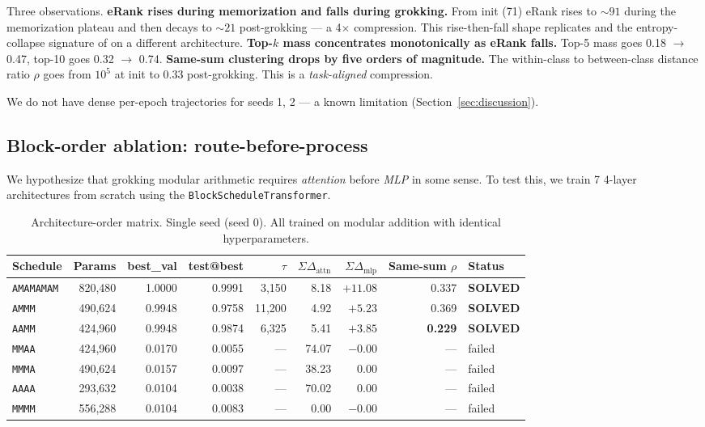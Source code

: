 \documentclass{article}
\begin{document}
Three observations. \textbf{eRank rises during memorization and falls during grokking.} From init (71) eRank rises to $\sim 91$ during the memorization plateau and then decays to $\sim 21$ post-grokking --- a 4$\times$ compression. This rise-then-fall shape replicates \citet{chen2025complexity} and the entropy-collapse signature of \citet{anonymous2026spectral} on a different architecture. \textbf{Top-$k$ mass concentrates monotonically as eRank falls.} Top-5 mass goes 0.18 $\to$ 0.47, top-10 goes 0.32 $\to$ 0.74. \textbf{Same-sum clustering drops by five orders of magnitude.} The within-class to between-class distance ratio $\rho$ goes from $10^5$ at init to $0.33$ post-grokking. This is a \emph{task-aligned} compression.

We do not have dense per-epoch trajectories for seeds 1, 2 --- a known limitation (Section~\ref{sec:discussion}).

\subsection{Block-order ablation: route-before-process}
\label{sec:arch-order}

We hypothesize that grokking modular arithmetic requires \emph{attention} before \emph{MLP} in some sense. To test this, we train 7 4-layer architectures from scratch using the \texttt{BlockScheduleTransformer}.

\begin{table}[h]
    \centering
    \caption{Architecture-order matrix. Single seed (seed 0). All trained on modular addition with identical hyperparameters.}
    \label{tab:arch-matrix}
    \footnotesize
    \begin{tabular}{lrrrrrrrl}
        \toprule
        Schedule & Params & best\_val & test@best & $\tau$ & $\Sigma\Delta_{\text{attn}}$ & $\Sigma\Delta_{\text{mlp}}$ & Same-sum $\rho$ & Status \\
        \midrule
        \texttt{AMAMAMAM} & 820,480 & 1.0000 & 0.9991 & 3,150 & 8.18 & $+11.08$ & 0.337 & \textbf{SOLVED} \\
        \texttt{AMMM} & 490,624 & 0.9948 & 0.9758 & 11,200 & 4.92 & $+5.23$ & 0.369 & \textbf{SOLVED} \\
        \texttt{AAMM} & 424,960 & 0.9948 & 0.9874 & 6,325 & 5.41 & $+3.85$ & \textbf{0.229} & \textbf{SOLVED} \\
        \texttt{MMAA} & 424,960 & 0.0170 & 0.0055 & --- & 74.07 & $-0.00$ & --- & failed \\
        \texttt{MMMA} & 490,624 & 0.0157 & 0.0097 & --- & 38.23 & 0.00 & --- & failed \\
        \texttt{AAAA} & 293,632 & 0.0104 & 0.0038 & --- & 70.02 & 0.00 & --- & failed \\
        \texttt{MMMM} & 556,288 & 0.0104 & 0.0083 & --- & 0.00 & $-0.00$ & --- & failed \\
        \bottomrule
    \end{tabular}
\end{table}
\end{document}
